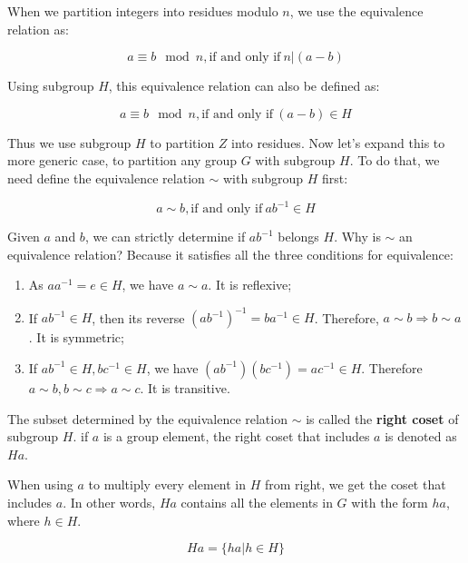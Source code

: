 \documentclass[b5paper]{article}
\begin{document}
When we partition integers into residues modulo $n$, we use the equivalence relation as:

\[
a \equiv b \mod n, \text{if and only if}\ n | (a - b)
\]

Using subgroup $H$, this equivalence relation can also be defined as:

\[
a \equiv b \mod n, \text{if and only if}\ (a - b) \in H
\]

Thus we use subgroup $H$ to partition $Z$ into residues. Now let's expand this to more generic case, to partition any group $G$ with subgroup $H$. To do that, we need define the equivalence relation $\sim$ with subgroup $H$ first:

\[
a \sim b, \text{if and only if}\ ab^{-1} \in H
\]

Given $a$ and $b$, we can strictly determine if $ab^{-1}$ belongs $H$. Why is $\sim$ an equivalence relation? Because it satisfies all the three conditions for equivalence:

\begin{enumerate}
\item As $aa^{-1} = e \in H$, we have $a \sim a$. It is reflexive;
\item If $ab^{-1} \in H$, then its reverse $(ab^{-1})^{-1}= ba^{-1} \in H$. Therefore, $a \sim b \Rightarrow b \sim a$. It is symmetric;
\item If $ab^{-1} \in H, bc^{-1} \in H$, we have $(ab^{-1})(bc^{-1}) = ac^{-1} \in H$. Therefore $a \sim b, b \sim c \Rightarrow a \sim c$. It is transitive.
\end{enumerate}

\begin{definition}
The subset determined by the equivalence relation $\sim$ is called the \textbf{right coset} of subgroup $H$. if $a$ is a group element, the right coset that includes $a$ is denoted as $Ha$.
\end{definition}

When using $a$ to multiply every element in $H$ from right, we get the coset that includes $a$. In other words, $Ha$ contains all the elements in $G$ with the form $ha$, where $h \in H$.

\[
Ha = \{ha | h \in H\}
\]
\end{document}
